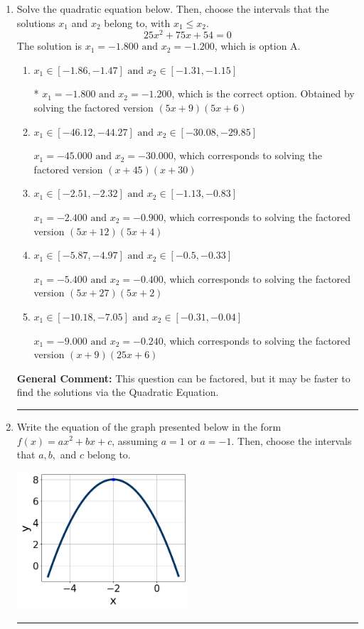 \documentclass{extbook}[14pt]
\newcommand{\litem}[1]{\item #1

\rule{\textwidth}{0.4pt}}
\begin{document}
\begin{enumerate}\litem{
Solve the quadratic equation below. Then, choose the intervals that the solutions $x_1$ and $x_2$ belong to, with $x_1 \leq x_2$.
\[ 25x^{2} +75 x + 54 = 0 \]The solution is \( x_1 = -1.800 \text{ and } x_2 = -1.200 \), which is option A.\begin{enumerate}[label=\Alph*.]
\item \( x_1 \in [-1.86, -1.47] \text{ and } x_2 \in [-1.31, -1.15] \)

* $x_1 = -1.800 \text{ and } x_2 = -1.200$, which is the correct option. Obtained by solving the factored version $(5x + 9)(5x + 6)$
\item \( x_1 \in [-46.12, -44.27] \text{ and } x_2 \in [-30.08, -29.85] \)

$x_1 = -45.000 \text{ and } x_2 = -30.000$, which corresponds to solving the factored version $(x + 45)(x + 30)$
\item \( x_1 \in [-2.51, -2.32] \text{ and } x_2 \in [-1.13, -0.83] \)

$x_1 = -2.400 \text{ and } x_2 = -0.900$, which corresponds to solving the factored version $(5x + 12)(5x + 4)$
\item \( x_1 \in [-5.87, -4.97] \text{ and } x_2 \in [-0.5, -0.33] \)

$x_1 = -5.400 \text{ and } x_2 = -0.400$, which corresponds to solving the factored version $(5x + 27)(5x + 2)$
\item \( x_1 \in [-10.18, -7.05] \text{ and } x_2 \in [-0.31, -0.04] \)

$x_1 = -9.000 \text{ and } x_2 = -0.240$, which corresponds to solving the factored version $(x + 9)(25x + 6)$
\end{enumerate}

\textbf{General Comment:} This question can be factored, but it may be faster to find the solutions via the Quadratic Equation.
}
\litem{
Write the equation of the graph presented below in the form $f(x)=ax^2+bx+c$, assuming  $a=1$ or $a=-1$. Then, choose the intervals that $a, b,$ and $c$ belong to.

\begin{center}
    \includegraphics[width=0.5\textwidth]{../Figures/quadraticGraphToEquationB.png}
\end{center}


}
\end{enumerate}
\end{document}
